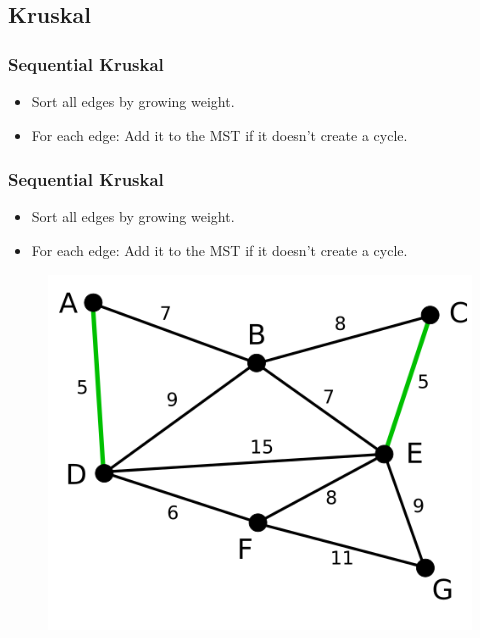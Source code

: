 \documentclass{beamer}
\begin{document}
\subsection{Kruskal}

\begin{frame}
    \frametitle{Sequential Kruskal}
    \begin{itemize}
        \item Sort all edges by growing weight.
        \item For each edge: Add it to the MST if it doesn't create a cycle.
    \end{itemize}


\end{frame}

\begin{frame}
    \frametitle{Sequential Kruskal}
    \begin{itemize}
        \item Sort all edges by growing weight.
        \item For each edge: Add it to the MST if it doesn't create a cycle.
    \end{itemize}

    \begin{figure}
        \includegraphics[width=.5\textwidth]{kruskal_2.png}
    \end{figure}

\end{frame}
\end{document}
